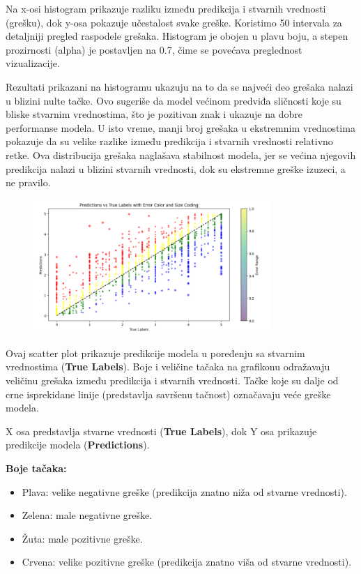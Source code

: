 \documentclass{article}
\begin{document}
Na x-osi histogram prikazuje razliku između predikcija i stvarnih vrednosti (grešku), dok y-osa pokazuje učestalost svake greške. Koristimo 50 intervala za detaljniji pregled raspodele grešaka. Histogram je obojen u plavu boju, a stepen prozirnosti (alpha) je postavljen na 0.7, čime se povećava preglednost vizualizacije.

Rezultati prikazani na histogramu ukazuju na to da se najveći deo grešaka nalazi u blizini nulte tačke. Ovo sugeriše da model većinom predviđa sličnosti koje su bliske stvarnim vrednostima, što je pozitivan znak i ukazuje na dobre performanse modela. U isto vreme, manji broj grešaka u ekstremnim vrednostima pokazuje da su velike razlike između predikcija i stvarnih vrednosti relativno retke. Ova distribucija grešaka naglašava stabilnost modela, jer se većina njegovih predikcija nalazi u blizini stvarnih vrednosti, dok su ekstremne greške izuzeci, a ne pravilo.


\begin{figure}[h]
    \centering 
    \includegraphics[width=0.8\textwidth]{ri3.png} 
\end{figure}

Ovaj scatter plot prikazuje predikcije modela u poređenju sa stvarnim vrednostima (\textbf{True Labels}). Boje i veličine tačaka na grafikonu odražavaju veličinu grešaka između predikcija i stvarnih vrednosti. Tačke koje su dalje od crne isprekidane linije (predstavlja savršenu tačnost) označavaju veće greške modela.

X osa predstavlja stvarne vrednosti (\textbf{True Labels}), dok Y osa prikazuje predikcije modela (\textbf{Predictions}).

\vspace{1em}
\textbf{Boje tačaka:}
\begin{itemize}
    \item Plava: velike negativne greške (predikcija znatno niža od stvarne vrednosti).
    \item Zelena: male negativne greške.
    \item Žuta: male pozitivne greške.
    \item Crvena: velike pozitivne greške (predikcija znatno viša od stvarne vrednosti).
\end{itemize}
\end{document}
